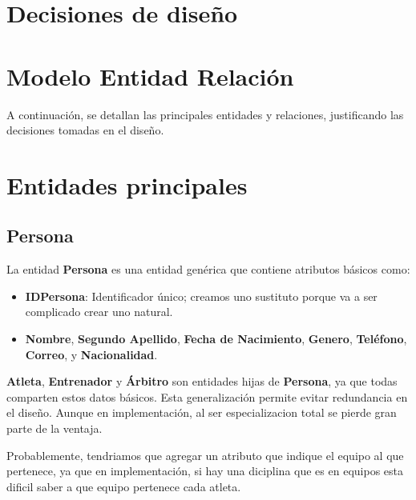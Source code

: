 \section*{Decisiones de diseño}
\section*{Modelo Entidad Relación}
A continuación, se detallan las principales entidades y relaciones, justificando las decisiones tomadas en el diseño.

\section*{Entidades principales}
\subsection*{Persona}
La entidad \textbf{Persona} es una entidad genérica que contiene atributos básicos como:
\begin{itemize}
    \item \textbf{IDPersona}: Identificador único; creamos uno sustituto porque va a ser complicado crear uno natural.
    \item \textbf{Nombre}, \textbf{Segundo Apellido}, \textbf{Fecha de Nacimiento}, \textbf{Genero}, \textbf{Teléfono}, \textbf{Correo}, y \textbf{Nacionalidad}.
\end{itemize}

\textbf{Atleta}, \textbf{Entrenador} y \textbf{Árbitro} son entidades hijas de \textbf{Persona}, ya que todas comparten estos datos básicos. Esta generalización permite evitar redundancia en el diseño. Aunque en implementación, al ser especializacion total se pierde gran parte de la ventaja. \vspace{0.3cm}

Probablemente, tendriamos que agregar un atributo que indique el equipo al que pertenece, ya que en implementación, si hay una diciplina que es en equipos esta dificil saber a que equipo pertenece cada atleta.

